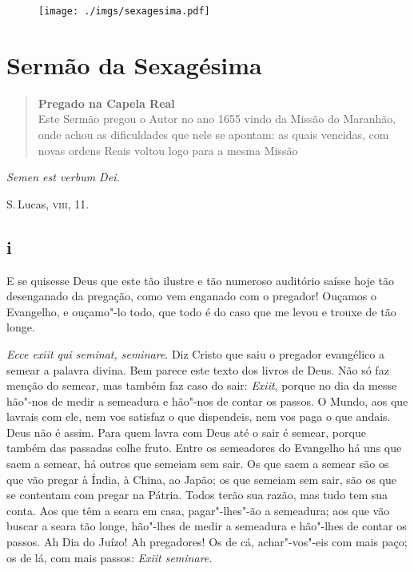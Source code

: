 \pagebreak
\thispagestyle{empty}
\movetoevenpage
\begin{figure}
\texttt{[image: ./imgs/sexagesima.pdf]}  
\end{figure}

\chapter{Sermão da Sexagésima}


\begin{quotation}
\noindent\textbf{Pregado na Capela Real}\\
Este Sermão pregou o Autor no ano 1655 vindo da Missão do Maranhão,
onde achou as dificuldades que nele se apontam: as quais vencidas, com novas ordens Reais voltou logo para a mesma Missão
\end{quotation}


\epigraph{\textit{Semen est verbum Dei.}}{ S.\,Lucas, \textsc{viii}, 11.}

\section{i}

\noindent{}E se quisesse Deus que este tão ilustre e tão numeroso auditório saísse
hoje tão desenganado da pregação, como vem enganado com o pregador!
Ouçamos o Evangelho, e ouçamo"-lo todo, que todo é do caso que me levou e
trouxe de tão longe.

\emph{Ecce exiit qui seminat, seminare}. Diz Cristo que saiu o pregador evangélico a semear a palavra divina. Bem parece este texto dos
livros de Deus. Não só faz menção do semear, mas também faz caso do
sair: \emph{Exiit}, porque no dia da messe hão"-nos de medir a semeadura
e hão"-nos de contar os passos. O Mundo, aos que lavrais com ele, nem vos
satisfaz o que dispendeis, nem vos paga o que andais. Deus não é assim.
Para quem lavra com Deus até
o sair é semear, porque também das passadas colhe fruto. Entre os
semeadores do Evangelho há uns que saem a semear, há outros que
semeiam sem sair. Os que saem a semear são os que vão pregar à Índia, à
China, ao Japão; os que semeiam sem sair, são os que se contentam com
pregar na Pátria. Todos terão sua razão, mas tudo tem sua conta. Aos que
têm a seara em casa, pagar"-lhes"-ão a semeadura; aos que vão buscar a
seara tão longe, hão"-lhes de medir a semeadura e hão"-lhes de contar os
passos. Ah Dia do Juízo! Ah pregadores! Os de cá, achar"-vos"-eis com mais
paço; os de lá, com mais passos: \emph{Exiit seminare.}


